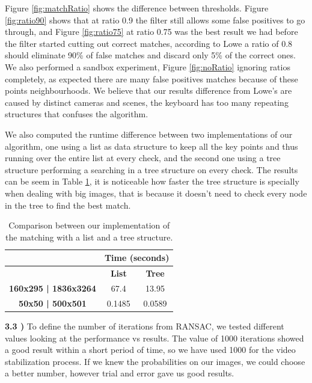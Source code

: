 \documentclass[12pt,a4paper]{article}
\begin{document}
	Figure \ref{fig:matchRatio} shows the difference between thresholds. Figure \ref{fig:ratio90} shows that at ratio 0.9 the filter still allows some false positives to go through, and Figure \ref{fig:ratio75} at ratio 0.75 was the best result we had before the filter started cutting out correct matches, according to Lowe a ratio of 0.8 should eliminate 90\% of false matches and discard only 5\% of the correct ones. We also performed a sandbox experiment, Figure \ref{fig:noRatio} ignoring ratios completely, as expected there are many false positives matches because of these points neighbourhoods. We believe that our results difference from Lowe's are caused by distinct cameras and scenes, the keyboard has too many repeating structures that confuses the algorithm. \\
\par
	We also computed the runtime difference between two implementations of our algorithm, one using a list as data structure to keep all the key points and thus running over the entire list at every check, and the second one using a tree structure performing a searching in a tree structure on every check. The results can be seem in Table \ref{table:match}, it is noticeable how faster the tree structure is specially when dealing with big images, that is because it doesn't need to check every node in the tree to find the best match. \\

\begin{table}[!h]
	\centering
	\begin{tabular}{|c|c|c|}
		\hline
		& \multicolumn{2}{c|}{\textbf{Time (seconds)}} \\ \hline
		\backslashbox{\textbf{Images Size}}{\textbf{Data Structure}}    & \textbf{List}         & \textbf{Tree}  \\ \hline
		\textbf{160x295 | 1836x3264}  & 67.4      & 13.95      \\ \hline
		\textbf{50x50 | 500x501} & 0.1485      & 0.0589         \\ \hline
	\end{tabular}
	\caption{Comparison between our implementation of the matching with a list and a tree structure.}
	\label{table:match}
\end{table}

\newpage

\textbf{3.3 )} To define the number of iterations from RANSAC, we tested different values looking at the performance vs results. The value of 1000 iterations showed a good result within a short period of time, so we have used 1000 for the video stabilization process. If we knew the probabilities on our images, we could choose a better number, however trial and error gave us good results. \\
\end{document}
